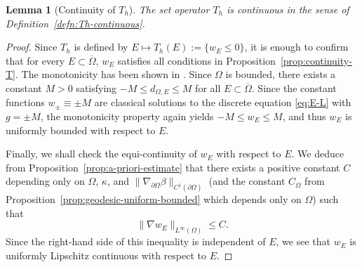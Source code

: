 \documentclass[11pt]{article}
\numberwithin{equation}{section}
\newtheorem{lemma}[theorem]{Lemma}
\newtheorem{remark}[theorem]{Remark}
\newcommand{\pOmega}[0]{\partial\Omega}
\newcommand{\sgrad}[0]{\nabla_{\pOmega}}
\newcommand{\closure}[1]{\overline{#1}}
\newcommand{\fix}[1]{\textcolor{red}{#1}}
\def\leq{\leqslant}
\begin{document}
\begin{lemma}[Continuity of $T_h$]
    \label{lem:Th_continuity} The set operator $T_h$ is continuous in the sense of Definition~\ref{defn:Th-continuous}.
\end{lemma}
\begin{proof}
    Since $T_h$ is defined by $E\mapsto T_h(E):=\{w_E\leq 0\}$, it is enough to confirm that for every $E\subset\closure{\Omega}$, $w_E$ satisfies
    all conditions in Proposition~\ref{prop:continuity-T}.
    The monotonicity has been shown in \cite[Lemma 3.1]{EG25}.
    Since $\Omega$ is bounded, there exists a constant $M > 0$ satisfying $-M\leq d_{\Omega,E}\leq M$ for all $E\subset\closure{\Omega}$.
    Since the constant functions $w_\pm \equiv\pm M$ are classical solutions to the discrete equation \eqref{eq:E-L} with $g=\pm M$, the monotonicity property again yields $-M\leq w_E\leq M$, and thus $w_E$ is uniformly bounded with respect to $E$.

    Finally, we shall check the equi-continuity of $w_E$ with respect to $E$. We deduce from Proposition~\ref{prop:a-priori-estimate} that there exists a positive constant $C$ depending only on $\Omega$, $\kappa$, and $\|\sgrad{\beta}\|_{C^1(\pOmega)}$ (and the constant $C_\Omega$ from Proposition~\ref{prop:geodesic-uniform-bounded} which depends only on $\Omega$) such that  $$\|\nabla w_E\|_{L^\infty(\Omega)}\leq C.$$
    Since the right-hand side of this inequality is independent of $E$, we see that $w_E$ is uniformly Lipschitz continuous with respect to $E$.
\end{proof}

\end{document}

